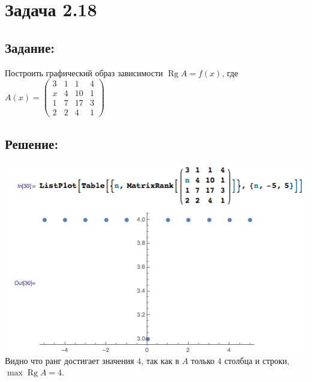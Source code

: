 \section{Задача 2.18}
\subsection{Задание:}
Построить графический образ зависимости $ \operatorname{Rg} A = f(x) $, где
\\[1em]
$
	A(x) =
	\begin{pmatrix}
		3 & 1 & 1 & 4 \\
		x & 4 & 10 & 1 \\
		1 & 7 & 17 & 3 \\
		2 & 2 & 4 & 1
	\end{pmatrix}
$
\subsection{Решение:}
\includegraphics[scale=0.6]{task/2_18/screen.png}
\\
Видно что ранг достигает значения $ 4 $, так как в $ A $ только $ 4 $ столбца и строки, $ \max \operatorname{Rg} A = 4 $.
